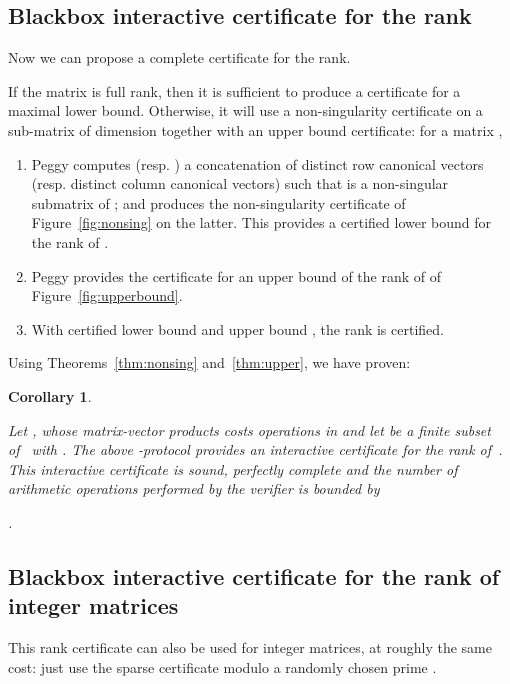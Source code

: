 \documentclass{article}
\newcommand{\customlinebreak}{}
\newtheorem{corollary}{Corollary}
\begin{document}
\subsection{Blackbox interactive certificate for the{\customlinebreak} rank}  
Now we can propose a complete certificate for the rank. 
 
If the matrix is full rank, then it is sufficient to produce a certificate for
a maximal lower bound.
Otherwise, it will use a non-singularity certificate on a sub-matrix of
dimension  together with an upper
bound certificate: 
for a matrix ,
\begin{enumerate}
\item 
   
  Peggy computes 
  (resp. ) a concatenation of  distinct
    row canonical vectors (resp.  distinct column canonical
    vectors) such that  is a non-singular
    submatrix of ;
    and produces the non-singularity certificate of
  Figure~\ref{fig:nonsing} on the latter. This
  provides a certified lower bound for the rank of .
\item Peggy provides the certificate for an upper bound  of the rank of 
  of Figure~\ref{fig:upperbound}. 
\item With certified lower bound  and upper bound , the rank
  is certified.
\end{enumerate}
Using Theorems~\ref{thm:nonsing} and~\ref{thm:upper}, we have proven:
\begin{corollary}\label{cor:sparserank}
 
  Let , whose matrix-vector products 
  costs  operations in  and let  be a finite subset of~ with 
  .  
  The above -protocol provides an interactive certificate for the rank
  of~.
  This interactive certificate is sound, perfectly complete and the number of
  arithmetic operations performed by the verifier is bounded by
   
  .
\end{corollary}


 
\subsection{Blackbox interactive certificate for the{\customlinebreak} rank of integer matrices}
This rank certificate can also be used for integer matrices, at roughly the same
cost: just use the sparse certificate modulo a randomly chosen prime .
\end{document}

